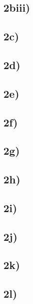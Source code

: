 \documentclass[
]{article}
\begin{document}
\hypertarget{biii}{%
\subsection{2biii)}\label{biii}}

\hypertarget{c-1}{%
\subsection{2c)}\label{c-1}}

\hypertarget{d-1}{%
\subsection{2d)}\label{d-1}}

\hypertarget{e}{%
\subsection{2e)}\label{e}}

\hypertarget{f}{%
\subsection{2f)}\label{f}}

\hypertarget{g}{%
\subsection{2g)}\label{g}}

\hypertarget{h}{%
\subsection{2h)}\label{h}}

\hypertarget{i}{%
\subsection{2i)}\label{i}}

\hypertarget{j}{%
\subsection{2j)}\label{j}}

\hypertarget{k}{%
\subsection{2k)}\label{k}}

\hypertarget{l}{%
\subsection{2l)}\label{l}}
\end{document}
